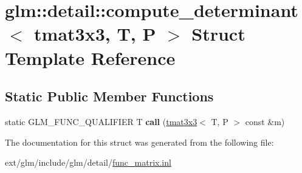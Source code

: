 \hypertarget{structglm_1_1detail_1_1compute__determinant_3_01tmat3x3_00_01_t_00_01_p_01_4}{\section{glm\-:\-:detail\-:\-:compute\-\_\-determinant$<$ tmat3x3, T, P $>$ Struct Template Reference}
\label{structglm_1_1detail_1_1compute__determinant_3_01tmat3x3_00_01_t_00_01_p_01_4}
}
\subsection*{Static Public Member Functions}
\begin{DoxyCompactItemize}
\item 
\hypertarget{structglm_1_1detail_1_1compute__determinant_3_01tmat3x3_00_01_t_00_01_p_01_4_a7531e9b1c92f41585a5d7667679084b3}{static G\-L\-M\-\_\-\-F\-U\-N\-C\-\_\-\-Q\-U\-A\-L\-I\-F\-I\-E\-R T {\bfseries call} (\hyperlink{structglm_1_1tmat3x3}{tmat3x3}$<$ T, P $>$ const \&m)}\label{structglm_1_1detail_1_1compute__determinant_3_01tmat3x3_00_01_t_00_01_p_01_4_a7531e9b1c92f41585a5d7667679084b3}

\end{DoxyCompactItemize}


The documentation for this struct was generated from the following file\-:\begin{DoxyCompactItemize}
\item 
ext/glm/include/glm/detail/\hyperlink{func__matrix_8inl}{func\-\_\-matrix.\-inl}\end{DoxyCompactItemize}
